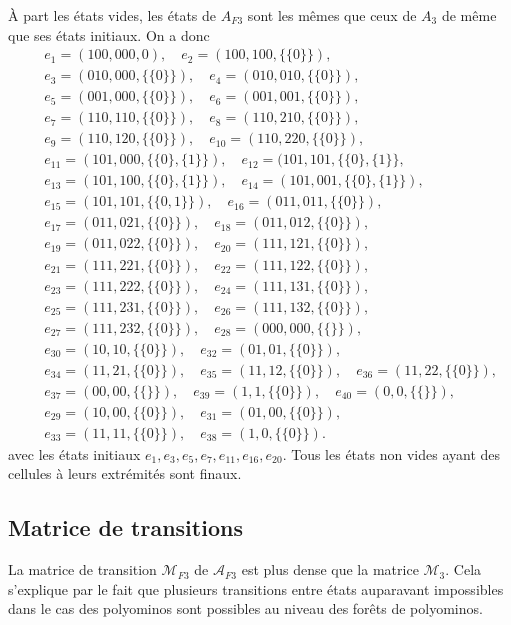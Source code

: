 À part les états vides, les états de $A_{F3}$  sont les mêmes que ceux de $A_{3}$ de même que ses états initiaux. On a donc 
\begin{eqnarray*}
& & e_{1}=(100,000,{{0}}),\quad e_{2}  = (100,100,\{\{0\}\}),\\
& & e_{3}  = (010,000,\{\{0\}\}),\quad e_{4}  =  (010,010,\{\{0\}\}),\\
& & e_{5}  =  (001,000,\{\{0\}\}),\quad e_{6}  = (001,001,\{\{0\}\}),\\
& & e_{7}  = (110,110,\{\{0\}\}), \quad e_{8}  = (110,210,\{\{0\}\}),\\
& & e_{9}  =  (110,120,\{\{0\}\}), \quad e_{10}  = (110,220,\{\{0\}\}),\\
& & e_{11} = (101,000,\{\{0\},\{1\}\}),\quad e_{12}  = (101,101,\{\{0\},\{1\}\},\\
& & e_{13} = (101,100,\{\{0\},\{1\}\}),\quad e_{14}=(101,001,\{\{0\},\{1\}\}),\\
& & e_{15}  = (101,101,\{\{0,1\}\}),\quad e_{16}  = (011,011,\{\{0\}\}),\\
& & e_{17}  = (011,021,\{\{0\}\}),\quad e_{18}  = (011,012,\{\{0\}\}),\\
& & e_{19}  =  (011,022,\{\{0\}\}),\quad e_{20}  = (111,121,\{\{0\}\}),\\
& & e_{21}  =  (111,221,\{\{0\}\}),\quad e_{22}  = (111,122,\{\{0\}\}),\\
& & e_{23}  =  (111,222,\{\{0\}\}),\quad e_{24}  = (111,131,\{\{0\}\}),\\
& & e_{25}  =  (111,231,\{\{0\}\}), \quad e_{26}  = (111,132,\{\{0\}\}),\\
& & e_{27}  =  (111,232,\{\{0\}\}),\quad e_{28}=(000,000,\{\{ \}\}),\\
& &  e_{30}= (10,10,\{\{0\}\}),\quad e_{32}= (01,01,\{\{0\}\}), \\
& & e_{34}= (11,21,\{\{0\}\}),\quad e_{35}= (11,12,\{\{0\}\}),\quad  e_{36}= (11,22,\{\{0\}\}),\\
& & e_{37}=(00,00,\{\{ \}\}),\quad e_{39}=(1,1,\{\{0\}\}),\quad e_{40}=(0,0,\{\{ \}\}),\\
& & e_{29}= (10,00,\{\{0\}\}),\quad e_{31}= (01,00,\{\{0\}\}),\\
& & e_{33}= (11,11,\{\{0\}\}),\quad e_{38}=(1,0,\{\{0\}\}).
 \end{eqnarray*}
 avec les états initiaux   $e_{1}, e_{3}, e_{5}, e_{7}, e_{11}, e_{16}, e_{20}.$  Tous les états non vides ayant des cellules à leurs extrémités sont finaux.
 \begin{spacing}{0.30}
 \subsection{Matrice de transitions}
 \end{spacing}
 La matrice de transition $\mathcal{M}_{F3}$ de $\mathcal{A}_{F3}$ est plus dense que la matrice $\mathcal{M}_{3}$. Cela s'explique par le fait
que plusieurs transitions entre états auparavant impossibles dans le cas des polyominos  sont  possibles au niveau des forêts de polyominos.
 
